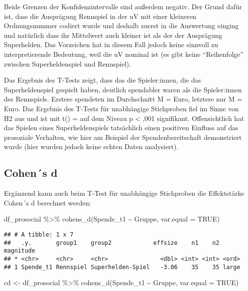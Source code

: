 \documentclass[
]{book}
\newenvironment{Shaded}{\begin{snugshade}}{\end{snugshade}}
\newcommand{\AttributeTok}[1]{\textcolor[rgb]{0.77,0.63,0.00}{#1}}
\newcommand{\ConstantTok}[1]{\textcolor[rgb]{0.00,0.00,0.00}{#1}}
\newcommand{\FunctionTok}[1]{\textcolor[rgb]{0.00,0.00,0.00}{#1}}
\newcommand{\NormalTok}[1]{#1}
\newcommand{\OtherTok}[1]{\textcolor[rgb]{0.56,0.35,0.01}{#1}}
\newcommand{\SpecialCharTok}[1]{\textcolor[rgb]{0.00,0.00,0.00}{#1}}
\begin{document}
Beide Grenzen der Konfidenzintervalle sind außerdem negativ. Der Grund dafür ist, dass die Ausprägung Rennspiel in der uV mit einer kleineren Ordnungsnummer codiert wurde und deshalb zuerst in die Auswertung einging und natürlich dass ihr Mittelwert auch kleiner ist als der der Ausprägung Superhelden. Das Vorzeichen hat in diesem Fall jedoch keine sinnvoll zu interpretierende Bedeutung, weil die uV nominal ist (es gibt keine ``Reihenfolge'' zwischen Superheldenspiel und Rennspiel).

Das Ergebnis des T-Tests zeigt, dass das die Spieler:innen, die das Superheldenspiel gespielt haben, deutlich spendabler waren als die Spieler:innen des Rennspiels. Erstere spendeten im Durchschnitt M =  Euro, letztere nur M =  Euro. Das Ergebnis des T-Tests für unabhängige Stichproben fiel im Sinne von H2 aus und ist mit t() =  auf dem Niveau p \textless{} ,001 signifikant. Offensichtlich hat das Spielen eines Superheldenspiels tatsächlich einen positiven Einfluss auf das prosoziale Verhalten, wie hier am Beispiel der Spendenbereitschaft demonstriert wurde (hier wurden jedoch keine echten Daten analysiert).

\hypertarget{cohens-d-1}{%
\subsection{Cohen´s d}\label{cohens-d-1}}

Ergänzend kann auch beim T-Test für unabhängige Stichproben die Effektstärke Cohen´s d berechnet werden:

\begin{Shaded}
\begin{Highlighting}[]
\NormalTok{df\_prosocial }\SpecialCharTok{\%\textgreater{}\%} 
  \FunctionTok{cohens\_d}\NormalTok{(Spende\_t1 }\SpecialCharTok{\textasciitilde{}}\NormalTok{ Gruppe, }\AttributeTok{var.equal =} \ConstantTok{TRUE}\NormalTok{) }
\end{Highlighting}
\end{Shaded}

\begin{verbatim}
## # A tibble: 1 x 7
##   .y.       group1    group2            effsize    n1    n2 magnitude
## * <chr>     <chr>     <chr>               <dbl> <int> <int> <ord>    
## 1 Spende_t1 Rennspiel Superhelden-Spiel   -3.06    35    35 large
\end{verbatim}

\begin{Shaded}
\begin{Highlighting}[]
\NormalTok{cd }\OtherTok{\textless{}{-}}\NormalTok{ df\_prosocial }\SpecialCharTok{\%\textgreater{}\%} 
  \FunctionTok{cohens\_d}\NormalTok{(Spende\_t1 }\SpecialCharTok{\textasciitilde{}}\NormalTok{ Gruppe, }\AttributeTok{var.equal =} \ConstantTok{TRUE}\NormalTok{) }
\end{Highlighting}
\end{Shaded}
\end{document}

